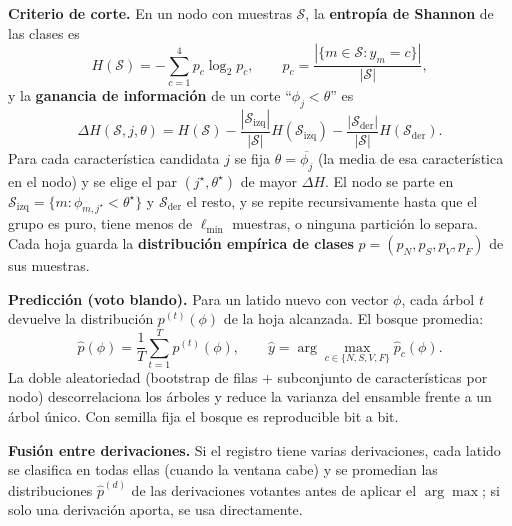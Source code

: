 \textbf{Criterio de corte.} En un nodo con muestras $\mathcal{S}$, la \textbf{entropía de Shannon} de las clases es
\begin{equation}
H(\mathcal{S})=-\sum_{c=1}^{4} p_c\log_2 p_c,\qquad p_c=\frac{|\{m\in\mathcal{S}:y_m=c\}|}{|\mathcal{S}|},
\end{equation}
y la \textbf{ganancia de información} de un corte ``$\phi_j<\theta$'' es
\begin{equation}
\Delta H(\mathcal{S},j,\theta)=H(\mathcal{S})-\frac{|\mathcal{S}_{\mathrm{izq}}|}{|\mathcal{S}|}H(\mathcal{S}_{\mathrm{izq}})-\frac{|\mathcal{S}_{\mathrm{der}}|}{|\mathcal{S}|}H(\mathcal{S}_{\mathrm{der}}).
\end{equation}
Para cada característica candidata $j$ se fija $\theta=\overline{\phi_j}$ (la media de esa característica en el nodo) y se elige el par $(j^\star,\theta^\star)$ de mayor $\Delta H$. El nodo se parte en $\mathcal{S}_{\mathrm{izq}}=\{m:\phi_{m,j^\star}<\theta^\star\}$ y $\mathcal{S}_{\mathrm{der}}$ el resto, y se repite recursivamente hasta que el grupo es puro, tiene menos de $\ell_{\min}$ muestras, o ninguna partición lo separa. Cada hoja guarda la \textbf{distribución empírica de clases} $p=(p_N,p_S,p_V,p_F)$ de sus muestras.

\textbf{Predicción (voto blando).} Para un latido nuevo con vector $\phi$, cada árbol $t$ devuelve la distribución $p^{(t)}(\phi)$ de la hoja alcanzada. El bosque promedia:
\begin{equation}
\hat{p}(\phi)=\frac{1}{T}\sum_{t=1}^{T}p^{(t)}(\phi),\qquad \hat{y}=\arg\max_{c\in\{N,S,V,F\}}\hat{p}_c(\phi).
\end{equation}
La doble aleatoriedad (bootstrap de filas + subconjunto de características por nodo) descorrelaciona los árboles y reduce la varianza del ensamble frente a un árbol único. Con semilla fija el bosque es reproducible bit a bit.

\textbf{Fusión entre derivaciones.} Si el registro tiene varias derivaciones, cada latido se clasifica en todas ellas (cuando la ventana cabe) y se promedian las distribuciones $\hat{p}^{(d)}$ de las derivaciones votantes antes de aplicar el $\arg\max$; si solo una derivación aporta, se usa directamente.

